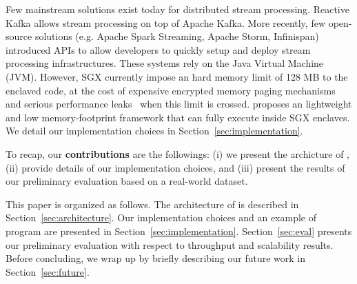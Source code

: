 Few mainstream solutions exist today for distributed stream processing.
Reactive Kafka\cite{reactivekafka} allows stream processing on top of Apache Kafka\cite{apachekafka}.
More recently, few open-source solutions (e.g. Apache Spark Streaming\cite{apachesparkstreaming}, Apache Storm\cite{apachestorm}, Infinispan\cite{infinispan}) introduced APIs to allow developers to quickly setup and deploy stream processing infrastructures.
These systems rely on the Java Virtual Machine (JVM)\cite{lindholm2014java}.
However, SGX currently impose an hard memory limit of 128 MB to the enclaved code, at the cost of expensive encrypted memory paging mechanisms and serious performance leaks~\cite{brenner_securekeeper:_2016} when this limit is crossed.
\SYS proposes an lightweight and low memory-footprint framework that can fully execute inside SGX enclaves.
We detail our implementation choices in Section~\ref{sec:implementation}.

To recap, our \textbf{contributions} are the followings: (i) we present the archicture of \SYS, (ii) provide details of our implementation choices, and (iii) present the results of our preliminary evaluation based on a real-world dataset.

This paper is organized as follows.
The architecture of \SYS is described in Section~\ref{sec:architecture}.
Our implementation choices and an example of \SYS program are presented in Section~\ref{sec:implementation}.
Section~\ref{sec:eval} presents our preliminary evaluation with respect to throughput and scalability results.
Before concluding, we wrap up by briefly describing our future work in Section~\ref{sec:future}.
